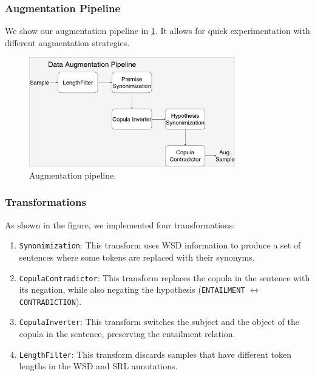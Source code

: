 \documentclass[english, xcolor={table,usenames}]{beamer}
\begin{document}
\begin{frame}
  \frametitle{Augmentation Pipeline}

  We show our augmentation pipeline in \cref{fig:pipeline}. It allows for quick experimentation
  with different augmentation strategies.

  \begin{figure}[H]
    \centering
    \includegraphics[width=0.8\textwidth]{images/pipeline.png}
    \caption{Augmentation pipeline.}
    \label{fig:pipeline}
  \end{figure}

\end{frame}

\begin{frame}
  \frametitle{Transformations}

  As shown in the figure, we implemented four transformations:

  \begin{enumerate}
    \item<1->


          \texttt{Synonimization}: This transform uses WSD information to produce a set of sentences where some tokens are replaced with their synonyms.
    \item<2-> \texttt{CopulaContradictor}: This transform replaces the copula in the sentence with its negation, while also negating the hypothesis (\texttt{ENTAILMENT} $\leftrightarrow$ \texttt{CONTRADICTION}).
    \item<3-> \texttt{CopulaInverter}: This transform switches the subject and the object of the copula in the sentence, preserving the entailment relation.
    \item<4-> \texttt{LengthFilter}: This transform discards samples that have different token lengths in the WSD and SRL annotations.
  \end{enumerate}



\end{frame}
\end{document}
